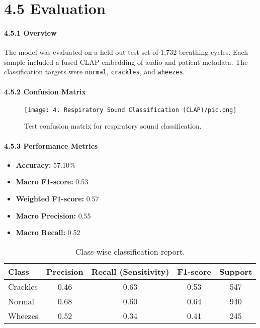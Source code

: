 \break
\section*{4.5 Evaluation}

\paragraph{4.5.1 Overview\\}
The model was evaluated on a held-out test set of 1,732 breathing cycles. Each sample included a fused CLAP embedding of audio and patient metadata. The classification targets were \texttt{normal}, \texttt{crackles}, and \texttt{wheezes}.

\paragraph{4.5.2 Confusion Matrix\\}
\begin{figure}[htbp]
    \centering
    \texttt{[image: 4. Respiratory Sound Classification (CLAP)/pic.png]}
    \caption{Test confusion matrix for respiratory sound classification.}
    \label{fig:enter-label}
\end{figure}

\paragraph{4.5.3 Performance Metrics\\}
\begin{itemize}
    \item \textbf{Accuracy:} 57.10\%
    \item \textbf{Macro F1-score:} 0.53
    \item \textbf{Weighted F1-score:} 0.57
    \item \textbf{Macro Precision:} 0.55
    \item \textbf{Macro Recall:} 0.52
\end{itemize}

\begin{table}[htbp]
\centering
\begin{tabular}{|l|c|c|c|c|}
\hline
\textbf{Class} & \textbf{Precision} & \textbf{Recall (Sensitivity)} & \textbf{F1-score} & \textbf{Support} \\
\hline
Crackles & 0.46 & 0.63 & 0.53 & 547 \\
Normal   & 0.68 & 0.60 & 0.64 & 940 \\
Wheezes  & 0.52 & 0.34 & 0.41 & 245 \\
\hline
\end{tabular}
\caption{Class-wise classification report.}
\end{table}

